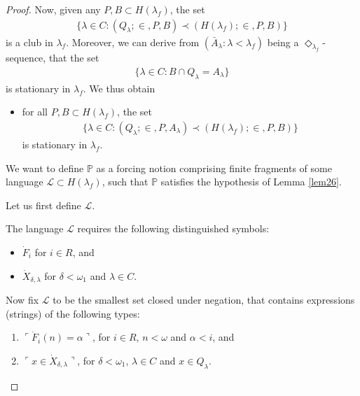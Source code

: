 \documentclass[12pt]{article}
\numberwithin{equation}{section}
\begin{document}
\begin{proof}
Now, given any $P, B \subset H(\lambda_f)$, the set
\begin{align*}
    \{\lambda \in C : (Q_{\lambda}; \in, P, B) \prec (H(\lambda_f); \in, P, B)\}
\end{align*}
is a club in $\lambda_f$. Moreover, we can derive from $(\bar{A}_{\lambda} : \lambda < \lambda_f)$ being a $\Diamond_{\lambda_f}$-sequence, that the set
\begin{align*}
    \{\lambda \in C : B \cap Q_{\lambda} = A_{\lambda}\}
\end{align*}
is stationary in $\lambda_f$. We thus obtain
\begin{itemize}[label=($\diamond$)]
    \item for all $P, B \subset H(\lambda_f)$, the set
    \begin{align*}
        \{\lambda \in C : (Q_{\lambda}; \in, P, A_{\lambda}) \prec (H(\lambda_f); \in, P, B)\}
    \end{align*}
    is stationary in $\lambda_f$.
\end{itemize}

We want to define $\mathbb{P}$ as a forcing notion comprising finite fragments of some language $\mathcal{L} \subset H(\lambda_f)$, such that $\mathbb{P}$ satisfies the hypothesis of Lemma \ref{lem26}.

Let us first define $\mathcal{L}$.

\begin{defi}\label{defl}
The language $\mathcal{L}$ requires the following distinguished symbols:
\begin{itemize}
    \item $\dot{F}_i$ for $i \in R$, and
    \item $\dot{X}_{\delta, \lambda}$ for $\delta < \omega_1$ and $\lambda \in C$.
\end{itemize}

Now fix $\mathcal{L}$ to be the smallest set closed under negation, that contains expressions (strings) of the following types:
\begin{enumerate}[label=(L\arabic*), leftmargin=40pt]
    \item $\ulcorner \dot{F}_i (n) = \alpha \urcorner$, for $i \in R$, $n < \omega$ and $\alpha < i$, and
    \item $\ulcorner x \in \dot{X}_{\delta, \lambda} \urcorner$, for $\delta < \omega_1$, $\lambda \in C$ and $x \in Q_{\lambda}$.
\end{enumerate}
\end{defi}


\end{proof}
\end{document}
